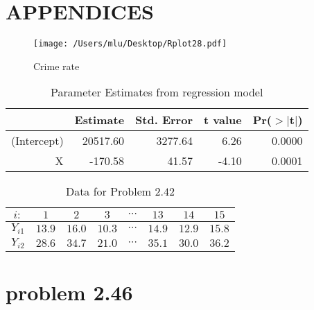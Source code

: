 \documentclass{article}
\begin{document}
\section{APPENDICES}
\label{sec:Appendices}
          
          
           \begin{figure}[htb]
     \begin{center}
     \texttt{[image: /Users/mlu/Desktop/Rplot28.pdf]}
     \caption{Crime rate}
     \end{center}
     \end{figure}
             
              


\begin{table}[ht]
\centering
\begin{tabular}{rrrrr}
  \hline
 & Estimate & Std. Error & t value & Pr($>$$|$t$|$) \\ 
  \hline
(Intercept) & 20517.60 & 3277.64 & 6.26 & 0.0000 \\ 
  X & -170.58 & 41.57 & -4.10 & 0.0001 \\ 
   \hline
\end{tabular}
\caption{Parameter Estimates from regression model} 
\label{reg21}
\end{table}
              

\begin{table}[h]
\caption{Data for Problem $2.42$}
\centering
\begin{tabular}{c c c c c c c c}
\hline\hline
$i:$ & $1$ & $2$ & $3$ & $\cdots$ & $13$ & $14$ & $15$ \\ [0.5ex]
\hline
$Y_{i1}$ & $13.9$ & $16.0$ & $10.3$ & $\cdots$ & $14.9$ & $12.9$ & $15.8$\\
$Y_{i2}$ & $28.6$ & $34.7$ & $21.0$ &$ \cdots$ & $35.1$ & $30.0$ & $36.2$ \\[1ex]
\hline
\end{tabular}
\label{table:nonlin}
\end{table}
 


\section{problem 2.46}
  


 
   
   
   
   
   
\end{document}
